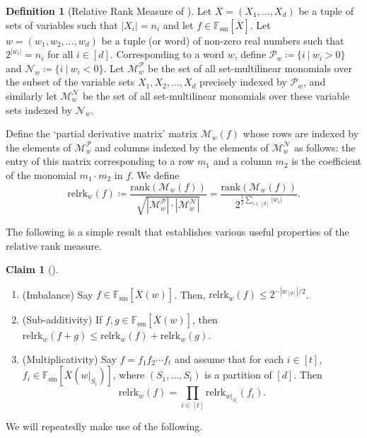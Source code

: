 \documentclass[10pt,a4paper]{article}
\theoremstyle{definition}%
\newtheorem{claim}[theorem]{Claim}
\newtheorem{definition}[theorem]{Definition}
\theoremstyle{plain}
\newcommand{\rk}{\mathrm{relrk}}
\newcommand{\Fsm}{\mathbb{F}_{\mathrm{sm}}}
\newcommand{\ol}[1]{\overline{#1}}
\newcommand{\calM}{\mathcal{M}}
\newcommand{\calN}{\mathcal{N}}
\newcommand{\calP}{\mathcal{P}}
\begin{document}
\begin{definition}[Relative Rank Measure of \cite{LST1}]\label{def:relrk}
Let $\ol{X}=(X_1,\ldots,X_d)$ be a tuple of sets of variables such that $|X_i|=n_i$ and let $f\in \Fsm[\ol{X}]$.
 Let $w = (w_1, w_2,\ldots, w_d)$ be a tuple (or word) of non-zero real numbers such that $2^{|w_i|}  = n_i $ for all $i \in [d]$. Corresponding to a word $w$, define $\calP_w \coloneqq \{i\ |\ w_i > 0\}$ and $\calN_w \coloneqq \{i\ |\ w_i < 0\}$. Let $\calM^{\calP}_{w}$ be the
set of all set-multilinear monomials over the subset of the variable sets $X_1, X_2,\ldots, X_d$ precisely
indexed by $\calP_w$, and similarly let $\calM^{\calN}_{w}$ be the set of all set-multilinear monomials over these variable
sets indexed by $\calN_w$.

Define the ‘partial derivative matrix’ matrix $\calM_w(f)$ whose rows are indexed by the elements
of $\calM^{\calP}_w$ and columns indexed by the elements of $\calM^{\calN}_{w}$ as follows: the entry of this matrix corresponding to a
row $m_1$ and a column $m_2$ is the coefficient of the monomial $m_1\cdot m_2$ in $f$. We define
\[
\rk_w(f) \coloneqq \frac{\mathrm{rank}(\calM_w(f))}{\sqrt{|\calM^{\calP}_w|\cdot |\calM^{\calN}_w|}} = \frac{\mathrm{rank}(\calM_w(f))}{2^{\frac{1}{2}\sum_{i\in[d]}|w_i|}}.
\]
\end{definition}


The following is a simple result that establishes various useful properties of the relative rank measure.
\begin{claim}[\cite{LST1}]\label{clm:rk-props}
\begin{enumerate}
    \item(Imbalance) Say $f \in \Fsm[\ol{X}(w)]$. Then, $\rk_w(f)\leq 2^{-|w_{[d]}|/2}$.
    \item(Sub-additivity) If $f,g \in \Fsm[\ol{X}(w)]$, then $\rk_w(f+g)\leq \rk_w(f)+\rk_w(g)$.
    \item(Multiplicativity) Say $f = f_1 f_2\cdots f_t $ and assume that for each $i\in [t]$, $f_i\in \Fsm[\ol{X}(w|_{S_i})]$, where $(S_1, \ldots, S_t)$ is a partition of $[d]$. Then
    \[
    \rk_w(f) = \prod_{i\in[t]} \rk_{w|_{S_i}}(f_i).
    \]
\end{enumerate}
\end{claim}

We will repeatedly make use of the following.
\end{document}

